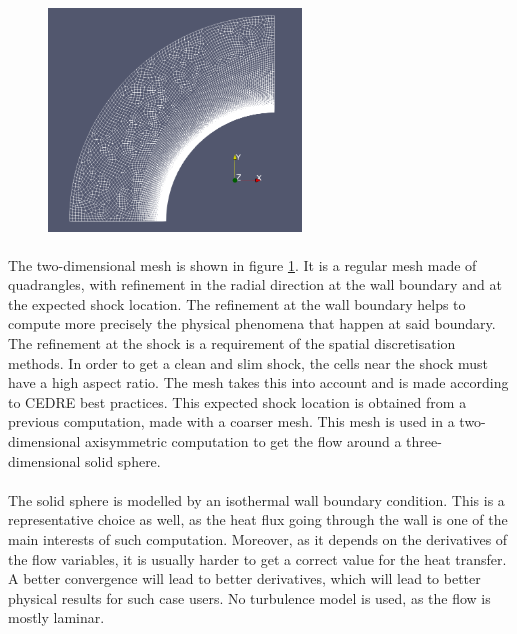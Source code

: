         \begin{figure}
          \centering
          \includegraphics[width=0.6\textwidth]{figures/sphere_mesh.png}
          \caption{}
          \label{fig:sphere_mesh}
        \end{figure}

        \paragraph{}
        The two-dimensional mesh is shown in figure \ref{fig:sphere_mesh}.
        It is a regular mesh made of quadrangles, with refinement in the radial direction at the wall boundary and at the expected shock location.
        The refinement at the wall boundary helps to compute more precisely the physical phenomena that happen at said boundary.
        The refinement at the shock is a requirement of the spatial discretisation methods.
        In order to get a clean and slim shock, the cells near the shock must have a high aspect ratio.
        The mesh takes this into account and is made according to CEDRE best practices.
        This expected shock location is obtained from a previous computation, made with a coarser mesh.
        This mesh is used in a two-dimensional axisymmetric computation to get the flow around a three-dimensional solid sphere.

        \paragraph{}
        The solid sphere is modelled by an isothermal wall boundary condition.
        This is a representative choice as well, as the heat flux going through the wall is one of the main interests of such computation.
        Moreover, as it depends on the derivatives of the flow variables, it is usually harder to get a correct value for the heat transfer.
        A better convergence will lead to better derivatives, which will lead to better physical results for such case users.
        No turbulence model is used, as the flow is mostly laminar.

